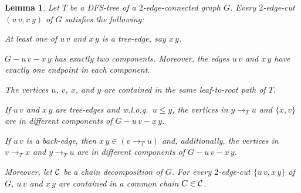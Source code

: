 \documentclass[paper=a4]{scrartcl}
\newtheorem{lemma}{Lemma}
\newcommand{\edge}[2]{\ensuremath{#1\,#2}}
\begin{document}
\begin{lemma}\label{lem:facts about cuts}
Let $T$ be a DFS-tree of a $2$-edge-connected graph $G$. Every $2$-edge-cut $(\edge uv,\edge xy)$ of $G$ satisfies the following:

\begin{compactenum}[(1)]
  \item At least one of $\edge uv$ and $\edge xy$ is a tree-edge, say $\edge xy$.\label{not both backedges}
  \item $G-\edge uv-\edge xy$ has exactly two components. Moreover, the edges $\edge uv$ and $\edge xy$ have exactly one endpoint in each component.\label{endpoints disconnected}
  \item The vertices $u$, $v$, $x$, and $y$ are contained in the same leaf-to-root path of $T$.\label{on a tree path}
  \item If $\edge uv$ and $\edge xy$ are tree-edges and w.l.o.g.\ $u \leq y$, the vertices in $y \rightarrow_T u$ and $\{x,v\}$ are in different components of $G-\edge uv-\edge xy$.\label{components two tree-edges}
  \item If $\edge uv$ is a back-edge, then $\edge xy \in (v \rightarrow_T u)$ and, additionally, the vertices in $v \rightarrow_T x$ and $y \rightarrow_T u$ are in different components of $G-\edge uv-\edge xy$.\label{components back and tree-edge}
\end{compactenum}\smallskip
\noindent Moreover, let ${\mathcal{C}}$ be a chain decomposition of $G$. For every $2$-edge-cut $\{\edge uv,\edge xy\}$ of $G$, $\edge uv$ and $\edge xy$ are contained in a common chain $C \in {\mathcal{C}}$.

\end{lemma}
\end{document}
